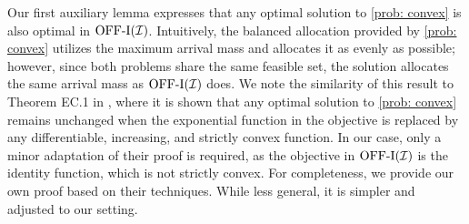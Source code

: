 {{%

}

{Our first auxiliary lemma expresses that any optimal solution to \ref{prob: convex} is also optimal in $\mathrm{\mathrm{OFF}}\textrm{-}\mathrm{I}(\mathcal I)$. 
Intuitively, the balanced allocation provided by \ref{prob: convex} utilizes the maximum arrival mass and allocates it as evenly as possible; however, since both problems share the same feasible set, the solution allocates the same arrival mass as $\mathrm{\mathrm{OFF}}\textrm{-}\mathrm{I}(\mathcal I)$ does. We note the similarity of this result to Theorem EC.1 in \citet{feng2024two}, where it is shown that any optimal solution to \ref{prob: convex} remains unchanged when the exponential function in the objective is replaced by any differentiable, increasing, and strictly convex function. In our case, only a minor adaptation of their proof is required, as the objective in $\mathrm{\mathrm{OFF}}\textrm{-}\mathrm{I}(\mathcal I)$ is the identity function, which is not strictly convex. For completeness, we provide our own proof based on their techniques. While less general, it is simpler and adjusted to our setting.
}

}
